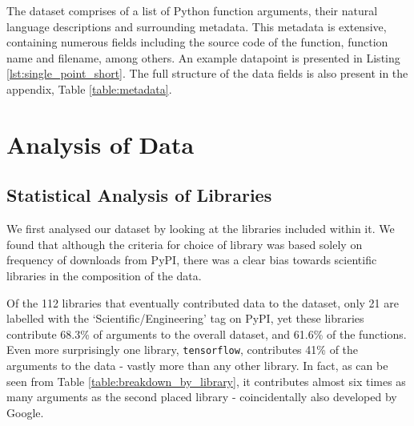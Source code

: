 The dataset comprises of a list of Python function arguments, their natural language descriptions and surrounding metadata. 
This metadata is extensive, containing numerous fields including the source code of the function, function name and filename, among others. 
An example datapoint is presented in Listing \ref{lst:single_point_short}. The full structure of the data fields is also present in the appendix, Table \ref{table:metadata}. 


\section{Analysis of Data} %
\label{sec:analysis_of_data}

\subsection{Statistical Analysis of Libraries}

We first analysed our dataset by looking at the libraries included within it.
We found that although the criteria for choice of library was based solely on frequency of downloads from PyPI, there was a clear bias towards scientific libraries in the composition of the data.

Of the 112 libraries that eventually contributed data to the dataset, only 21 are labelled with the `Scientific/Engineering' tag on PyPI, yet these libraries contribute 68.3\% of arguments to the overall dataset, and 61.6\% of the functions. 
Even more surprisingly one library, \texttt{tensorflow}, contributes 41\% of the arguments to the data - vastly more than any other library.
In fact, as can be seen from Table \ref{table:breakdown_by_library}, it contributes almost six times as many arguments as the second placed library - coincidentally also developed by Google. 

